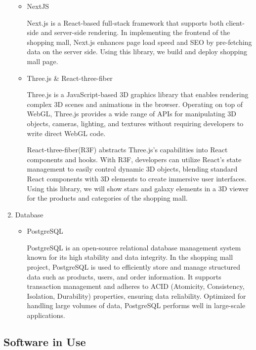 \documentclass[conference]{IEEEtran}
\begin{document}
\begin{enumerate}
\begin{itemize}
\item NextJS 

Next.js is a React-based full-stack framework that supports both client-side and server-side rendering. In implementing the frontend of the shopping mall, Next.js enhances page load speed and SEO by pre-fetching data on the server side. Using this library, we build and deploy shopping mall page.

\item Three.js \& React-three-fiber

Three.js is a JavaScript-based 3D graphics library that enables rendering complex 3D scenes and animations in the browser. Operating on top of WebGL, Three.js provides a wide range of APIs for manipulating 3D objects, cameras, lighting, and textures without requiring developers to write direct WebGL code.

React-three-fiber(R3F) abstracts Three.js’s capabilities into React components and hooks. With R3F, developers can utilize React’s state management to easily control dynamic 3D objects, blending standard React components with 3D elements to create immersive user interfaces. Using this library, we will show stars and galaxy elements in a 3D viewer for the products and categories of the shopping mall. 

\end{itemize}

\item Database

\begin{itemize}
\setlength{\parindent}{2ex}
\setlength{\parskip}{0.5em}
\item PostgreSQL

PostgreSQL is an open-source relational database management system known for its high stability and data integrity. In the shopping mall project, PostgreSQL is used to efficiently store and manage structured data such as products, users, and order information. It supports transaction management and adheres to ACID (Atomicity, Consistency, Isolation, Durability) properties, ensuring data reliability. Optimized for handling large volumes of data, PostgreSQL performs well in large-scale applications.

\end{itemize}

\end{enumerate}

\subsection{Software in Use}
\end{document}
